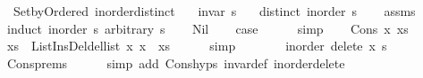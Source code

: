 \begin{isabellebody}
\isanewline
{}\isamarkupfalse%
%
\endisatagproof
{\isafoldproof}%
%
\isadelimproof
%
\endisadelimproof
%
\isadelimdocument
%
\endisadelimdocument
%
\isatagdocument
%
\isamarkuptrue%
%
\endisatagdocument
{\isafolddocument}%
%
\isadelimdocument
%
\endisadelimdocument
{}\isamarkupfalse%
\ {\isacharparenleft}{\kern0pt}\ Set{\isacharunderscore}{\kern0pt}by{\isacharunderscore}{\kern0pt}Ordered{\isacharparenright}{\kern0pt}\ inorder{\isacharunderscore}{\kern0pt}distinct{\isacharcolon}{\kern0pt}\isanewline
\ \ \ {\isachardoublequoteopen}invar\ s{\isachardoublequoteclose}\isanewline
\ \ \ {\isachardoublequoteopen}distinct\ {\isacharparenleft}{\kern0pt}inorder\ s{\isacharparenright}{\kern0pt}{\isachardoublequoteclose}\isanewline
%
\isadelimproof
\ \ %
\endisadelimproof
%
\isatagproof
{}\isamarkupfalse%
\ assms\isanewline
{}\isamarkupfalse%
\ {\isacharparenleft}{\kern0pt}induct\ {\isachardoublequoteopen}inorder\ s{\isachardoublequoteclose}\ arbitrary{\isacharcolon}{\kern0pt}\ s{\isacharparenright}{\kern0pt}\isanewline
\ \ \isamarkupfalse%
\ Nil\isanewline
\ \ \isamarkupfalse%
\ {\isacharquery}{\kern0pt}case\isanewline
\ \ \ \ \isamarkupfalse%
\ simp\isanewline
{}\isamarkupfalse%
\isanewline
\ \ \isamarkupfalse%
\ {\isacharparenleft}{\kern0pt}Cons\ x\ xs{\isacharparenright}{\kern0pt}\isanewline
\ \ \isamarkupfalse%
\ {\isachardoublequoteopen}xs\ {\isacharequal}{\kern0pt}\ List{\isacharunderscore}{\kern0pt}Ins{\isacharunderscore}{\kern0pt}Del{\isachardot}{\kern0pt}del{\isacharunderscore}{\kern0pt}list\ x\ {\isacharparenleft}{\kern0pt}x\ {\isacharhash}{\kern0pt}\ xs{\isacharparenright}{\kern0pt}{\isachardoublequoteclose}\isanewline
\ \ \ \ \isamarkupfalse%
\ simp\isanewline
\ \ \isamarkupfalse%
\ \isamarkupfalse%
\ {\isachardoublequoteopen}{\isachardot}{\kern0pt}{\isachardot}{\kern0pt}{\isachardot}{\kern0pt}\ {\isacharequal}{\kern0pt}\ inorder\ {\isacharparenleft}{\kern0pt}delete\ x\ s{\isacharparenright}{\kern0pt}{\isachardoublequoteclose}\isanewline
\ \ \ \ \isamarkupfalse%
\ Cons{\isachardot}{\kern0pt}prems\isanewline
\ \ \ \ \isamarkupfalse%
\ {\isacharparenleft}{\kern0pt}simp\ add{\isacharcolon}{\kern0pt}\ Cons{\isachardot}{\kern0pt}hyps{\isacharparenleft}{\kern0pt}{}{\isacharparenright}{\kern0pt}\ invar{\isacharunderscore}{\kern0pt}def\ inorder{\isacharunderscore}{\kern0pt}delete{\isacharparenright}{\kern0pt}\isanewline

\end{isabellebody}
